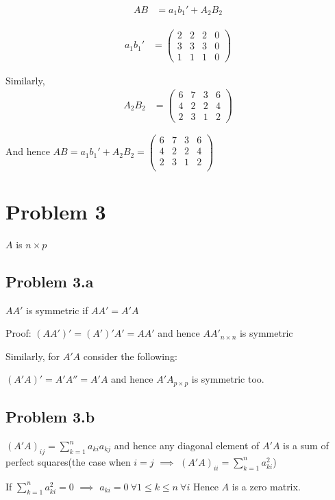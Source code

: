 \documentclass[a4paper]{article}
\begin{document}
\begin{align*}
AB &= a_1b_1' + A_2B_2
\end{align*}

\begin{align*}
a_1b_1' &= \begin{pmatrix}
2 &   2 & 2 &   0\\
3 &   3  &  3 &   0\\
1  &  1 &   1 &   0
\end{pmatrix}
\end{align*}

Similarly,
\begin{align*}
A_2B_2 &= \begin{pmatrix}
6 &   7 &   3 &   6\\
4 &   2  &  2  &  4\\
2  &  3   & 1 &   2
\end{pmatrix}
\end{align*}

And hence $AB = a_1b_1' + A_2B_2 = \begin{pmatrix}
6 &   7 &   3 &   6\\
4  &  2  &  2  &  4\\
2  &  3 &   1 &   2\\
\end{pmatrix}$
\section*{Problem 3}
$A$ is $n \times p$
\subsection*{Problem 3.a}
$AA'$ is symmetric if $AA' = A'A$

Proof:
$(AA')' = (A')'A' = AA'$ and hence $AA'_{n \times n}$ is symmetric

Similarly, for $A'A$ consider the following:

$(A'A)' = A'A''  = A'A$ and hence $A'A_{p \times p}$ is symmetric too.

\subsection*{Problem 3.b}

$(A'A)_{ij} = \sum_{k=1}^n a_{ki}a_{kj}$ and hence any diagonal element of $A'A$ is a sum of perfect squares(the case when $i=j$ $\implies$ $(A'A)_{ii} = \sum_{k=1}^n a_{ki}^2$)

If $\sum_{k=1}^n a_{ki}^2 =0$ $\implies$ $a_{ki} =0\  \forall 1 \leq k \leq n\  \forall i$ Hence $A$ is a zero matrix.
\end{document}
